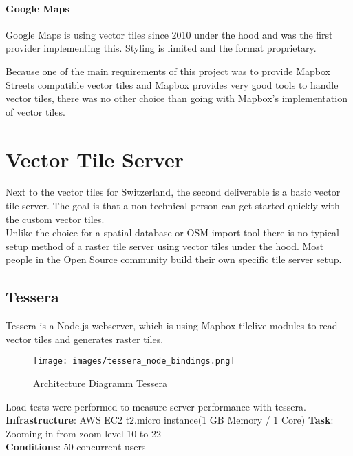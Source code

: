 \paragraph{Google Maps}

Google Maps is using vector tiles since 2010 under the hood and was the
first provider implementing this. Styling is limited and the format
proprietary.


\begin{tcolorbox}[arc=0mm,boxrule=1pt,title=Decision]\label{vector_tile_spec_impl_decision}
Because one of the main requirements of this project was to provide Mapbox Streets compatible vector tiles and Mapbox provides very good tools to handle vector tiles, there was no other choice than going with Mapbox's implementation of vector tiles.
\end{tcolorbox}

\section{Vector Tile Server}\label{vector_tile_server}

Next to the vector tiles for Switzerland, the second deliverable is a basic vector tile server. The goal is that a non technical person can get started quickly with the custom vector tiles.\\

Unlike the choice for a spatial database or OSM import tool
there is no typical setup method of a raster tile server using vector tiles under the hood. Most people in the Open Source community build their own specific tile server setup.

\subsection{Tessera}\label{tessera}

Tessera\cite{13_github_2015} is a Node.js\cite{14_foundation_2015} webserver, which is using Mapbox tilelive\cite{15_github_2015} modules to read vector tiles and generates raster tiles.

\begin{figure}[H]
\centering
  \texttt{[image: images/tessera\_node\_bindings.png]}
  \caption{Architecture Diagramm Tessera}
\end{figure}
\newpage

Load tests were performed to measure server performance with tessera.
\\
\textbf{Infrastructure}: AWS EC2 t2.micro instance(1 GB Memory / 1 Core)
\textbf{Task}: Zooming in from zoom level 10 to 22 \\
\textbf{Conditions}: 50 concurrent users \\

